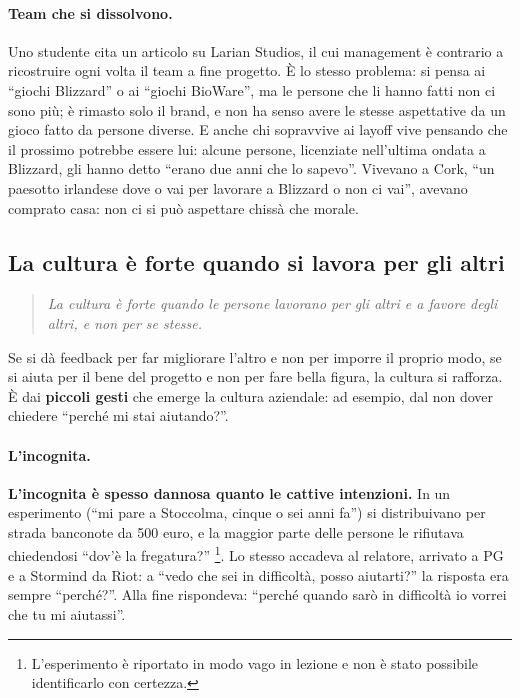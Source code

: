 \paragraph{Team che si dissolvono.} Uno studente cita un articolo su Larian
Studios, il cui management è contrario a ricostruire ogni volta il team a fine
progetto. È lo stesso problema: si pensa ai ``giochi Blizzard'' o ai ``giochi
BioWare'', ma le persone che li hanno fatti non ci sono più; è rimasto solo il
brand, e non ha senso avere le stesse aspettative da un gioco fatto da persone
diverse. E anche chi sopravvive ai layoff vive pensando che il prossimo
potrebbe essere lui: alcune persone, licenziate nell'ultima ondata a
Blizzard, gli hanno detto ``erano due anni che lo sapevo''. Vivevano a Cork,
``un paesotto irlandese dove o vai per lavorare a Blizzard o non ci vai'',
avevano comprato casa: non ci si può aspettare chissà che morale.

\subsection{La cultura è forte quando si lavora per gli altri}

\begin{quote}
  \emph{La cultura è forte quando le persone lavorano per gli altri e a favore
  degli altri, e non per se stesse.}
\end{quote}

Se si dà feedback per far migliorare l'altro e non per imporre il proprio
modo, se si aiuta per il bene del progetto e non per fare bella figura, la
cultura si rafforza. È dai \textbf{piccoli gesti} che emerge la cultura
aziendale: ad esempio, dal non dover chiedere ``perché mi stai aiutando?''.

\paragraph{L'incognita.} \textbf{L'incognita è spesso dannosa quanto le
cattive intenzioni.} In un esperimento (``mi pare a Stoccolma, cinque o sei
anni fa'') si distribuivano per strada banconote da 500 euro, e la maggior
parte delle persone le rifiutava chiedendosi ``dov'è la fregatura?''
\footnote{L'esperimento è riportato in modo vago in lezione e non è stato
possibile identificarlo con certezza.}. Lo stesso accadeva al relatore,
arrivato a PG e a Stormind da Riot: a ``vedo che sei in difficoltà, posso
aiutarti?'' la risposta era sempre ``perché?''. Alla fine rispondeva: ``perché
quando sarò in difficoltà io vorrei che tu mi aiutassi''.

